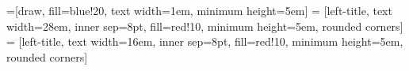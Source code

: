 \documentclass[a4paper]{article}
\def\parchmentframe#1{
\tikz{
  \node[inner sep=2em] (A) {#1};  %
  \begin{pgfonlayer}{background}  %
  \filldraw[normal border,rounded corners,color=blue!10!yellow!5,draw=blue!25!yellow,dashed] 
        (A.south east) -- (A.south west) -- 
        (A.north west) -- (A.north east);
  \end{pgfonlayer}}}
\def\parchmentframetop#1{
\tikz{
  \node[inner sep=2em] (A) {#1};    %
  \begin{pgfonlayer}{background}    
  \filldraw[normal border,rounded corners,color=blue!10!yellow!5,draw=blue!25!yellow,dashed] 
        (A.south east) -- (A.south west) -- 
        (A.north west) -- (A.north east);
  \end{pgfonlayer}}}
\def\parchmentframebottom#1{
\tikz{
  \node[inner sep=2em] (A) {#1};   %
  \begin{pgfonlayer}{background}   
  \filldraw[normal border,rounded corners,color=blue!10!yellow!5,draw=blue!25!yellow,dashed] 
        (A.south east) -- (A.south west) -- 
        (A.north west) -- (A.north east);
  \end{pgfonlayer}}}
\def\parchmentframemiddle#1{
\tikz{
  \node[inner sep=2em] (A) {#1};   %
  \begin{pgfonlayer}{background}   
  \filldraw[normal border,rounded corners,color=blue!10!yellow!5,draw=blue!25!yellow,dashed] 
        (A.south east) -- (A.south west) -- 
        (A.north west) -- (A.north east);
  \end{pgfonlayer}}}
\newenvironment{parchment}[1][Example]{%
  \def\FrameCommand{\parchmentframe}%
  \def\FirstFrameCommand{\parchmentframetop}%
  \def\LastFrameCommand{\parchmentframebottom}%
  \def\MidFrameCommand{\parchmentframemiddle}%
  \vskip\baselineskip
  \MakeFramed {\FrameRestore}
  \noindent\tikz\node[rounded corners, inner sep=2ex, draw=blue!25!yellow, fill=white, dashed, anchor=west, overlay] at (0em, 2em) {\sffamily#1};\par}%
{\endMakeFramed}
\begin{document}

=[draw, fill=blue!20, text width=1em, minimum height=5em]
 = [left-title, text width=28em, inner sep=8pt, fill=red!10, minimum height=5em, rounded corners]
 = [left-title, text width=16em, inner sep=8pt, fill=red!10, minimum height=5em, rounded corners]

\begin{comment}
\begin{parchment}[initialization]
  Gallia est omnis divisa in partes tres, quarum unam incolunt Belgae, aliam Aquitani, tertiam qui ipsorum lingua Celtae, nostra Galli appellantur. Hi omnes lingua, institutis, legibus inter se differunt. Gallos ab Aquitanis Garumna flumen, a Belgis Matrona et Sequana dividit. Horum omnium fortissimi sunt Belgae, propterea quod a cultu atque humanitate provinciae longissime absunt, minimeque ad eos mercatores saepe commeant atque ea quae ad effeminandos animos pertinent important, proximique sunt Germanis, qui trans Rhenum incolunt, quibuscum continenter bellum gerunt. Qua de causa Helvetii quoque reliquos Gallos virtute praecedunt, quod fere cotidianis proeliis cum Germanis contendunt, cum aut suis finibus eos prohibent aut ipsi in eorum finibus bellum gerunt. Eorum una pars, quam Gallos obtinere dictum est, initium capit a flumine Rhodano, continetur Garumna flumine, Oceano, finibus Belgarum, attingit etiam ab Sequanis et Helvetiis flumen Rhenum, vergit ad septentriones. Belgae ab extremis Galliae finibus oriuntur, pertinent ad inferiorem partem fluminis Rheni, spectant in septentrionem et orientem solem. Aquitania a Garumna flumine ad Pyrenaeos montes et eam partem Oceani quae est ad Hispaniam pertinet; spectat inter occasum solis et septentriones.
\end{parchment}
\end{comment}
\end{document}
